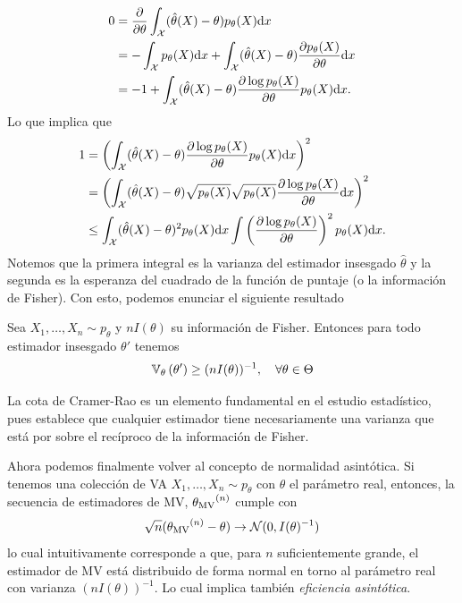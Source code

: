 \begin{align*}
	0 &= \frac{\partial}{\partial\theta}\int_{\mathcal X} (\hat{\theta}(X)-\theta)p_\theta(X){\text{d}x}\\
	  &= -\int_{\mathcal X} p_\theta(X){\text{d}x}  + \int_{\mathcal X} (\hat{\theta}(X)-\theta)\frac{\partial p_\theta(X)}{\partial\theta}{\text{d}x}\\
	  &= -1  + \int_{\mathcal X} (\hat{\theta}(X)-\theta)\frac{\partial\log p_\theta(X) }{\partial\theta}p_\theta(X){\text{d}x}.
\end{align*}
Lo que implica que 
\begin{align*}
	1 &= \left(\int_{\mathcal X} (\hat{\theta}(X)-\theta)\frac{\partial\log p_\theta(X) }{\partial\theta}p_\theta(X){\text{d}x}\right)^2\\
	&=\left(\int_{\mathcal X} (\hat{\theta}(X)-\theta)\sqrt{p_\theta(X)}\sqrt{p_\theta(X)}\frac{\partial\log p_\theta(X) }{\partial\theta}{\text{d}x}\right)^2\\
	&\leq\int_{\mathcal X} (\hat{\theta}(X)-\theta)^2 p_\theta(X){\text{d}x} \int\left(\frac{\partial\log p_\theta(X) }{\partial\theta}\right)^2 p_\theta(X){\text{d}x}.
\end{align*}
Notemos que la primera integral es la varianza del estimador insesgado $\hat\theta$ y la segunda es la esperanza del cuadrado de la función de puntaje (o la información de Fisher). Con esto, podemos enunciar el siguiente resultado 
\begin{definition}
	Sea $X_1,\ldots,X_n \sim p_\theta$ y $nI(\theta)$ su información de Fisher. Entonces para todo estimador insesgado $\theta'$ tenemos 
	\begin{equation}
		\mathbb{V}_\theta \left(\theta'\right)\geq (nI(\theta))^{-1},\quad \forall \theta\in\Theta
	\end{equation}
\end{definition}
La cota de Cramer-Rao es un elemento fundamental en el estudio estadístico, pues establece que cualquier estimador tiene necesariamente una varianza que está por sobre el recíproco de la información de Fisher. 

Ahora podemos finalmente volver al concepto de normalidad asintótica. Si tenemos una colección de VA $X_1,\ldots,X_n\sim p_\theta$ con $\theta$ el parámetro real, entonces, la secuencia de estimadores de MV, ${\theta_\text{MV}}^{(n)}$ cumple con 
\begin{equation}
	\sqrt{n}({\theta_\text{MV}}^{(n)}-\theta)\rightarrow {\mathcal N}(0,I(\theta)^{-1})
\end{equation}
lo cual intuitivamente corresponde a que, para $n$ suficientemente grande, el estimador de MV está distribuido de forma normal en torno al parámetro real con varianza $(nI(\theta))^{-1}$. Lo cual implica también \textit{eficiencia asintótica}.

